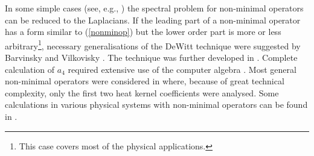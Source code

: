 In some simple cases (see, e.g., 
\cite{GBF:1991,Alexandrov:1996gu,Vassilevich:1995bg}) the spectral
problem for non-minimal operators can be reduced to the Laplacians.
If the leading part of a non-minimal operator has a form similar to
(\ref{nonminop}) but the lower order part is more or less 
arbitrary\footnote{This case covers most of the physical applications.},
necessary generalisations of the DeWitt technique were suggested by
Barvinsky and Vilkovisky \cite{Barvinsky:1985an}. The technique was
further developed in \cite{Gusynin:1991ek,Cho:1995ic}. Complete
calculation of $a_4$ required extensive use of the computer algebra
\cite{Gusynin:1997qs}. Most general non-minimal operators were
considered in \cite{Avramidi:2001tx} where, because of great technical
complexity, only the first two heat kernel coefficients were analysed.
Some calculations in various physical systems with non-minimal operators
can be found in 
\cite{Fradkin:1982ts,Parker:1984pe,Guendelman:1994ke,Pronin:1997bu}.
